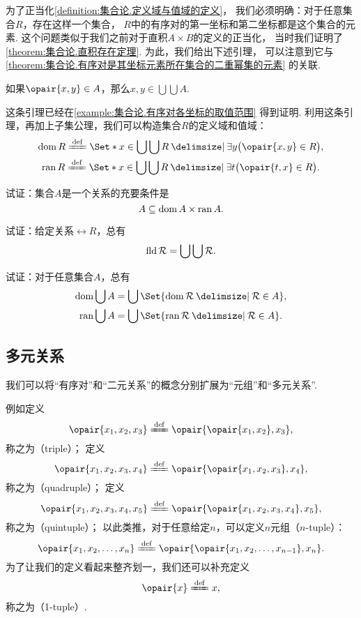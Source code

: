 为了正当化\cref{definition:集合论.定义域与值域的定义}，
我们必须明确：对于任意集合\(R\)，存在这样一个集合，
\(R\)中的有序对的第一坐标和第二坐标都是这个集合的元素.
这个问题类似于我们之前对于直积\(A \times B\)的定义的正当化，
当时我们证明了\cref{theorem:集合论.直积存在定理}.
为此，我们给出下述引理，
可以注意到它与\cref{theorem:集合论.有序对是其坐标元素所在集合的二重幂集的元素} 的关联.

\begin{lemma}
如果\(\opair{x,y} \in A\)，那么\(x,y \in \bigcup\bigcup A\).
\end{lemma}
这条引理已经在\cref{example:集合论.有序对各坐标的取值范围} 得到证明.
利用这条引理，再加上子集公理，我们可以构造集合\(R\)的定义域和值域：
\begin{gather}
	\dom R
	\defeq
	\Set*{ x \in \bigcup\bigcup R \given \exists y \bigl( \opair{x,y} \in R \bigr) }, \\
	\ran R
	\defeq
	\Set*{ x \in \bigcup\bigcup R \given \exists t \bigl( \opair{t,x} \in R \bigr) }.
\end{gather}

\begin{example}
试证：集合\(A\)是一个关系的充要条件是\[
	A \subseteq \operatorname{dom} A \times \operatorname{ran} A.
\]
\end{example}

\begin{example}
试证：给定关系\(\rel{R}\)，总有\[
	\operatorname{fld} \mathcal{R} = \bigcup\bigcup \mathcal{R}.
\]
\end{example}

\begin{example}
试证：对于任意集合\(A\)，总有\begin{gather}
	\dom\bigcup A = \bigcup\Set{ \dom\rel{R} \given \rel{R} \in A }, \\
	\ran\bigcup A = \bigcup\Set{ \ran\rel{R} \given \rel{R} \in A }.
\end{gather}
\end{example}

\subsection{多元关系}
我们可以将“有序对”和“二元关系”的概念分别扩展为“元组”和“多元关系”.

例如定义\[
	\opair{x_1,x_2,x_3}
	\defeq
	\opair{\opair{x_1,x_2},x_3},
\]
称之为（triple）；
定义\[
	\opair{x_1,x_2,x_3,x_4}
	\defeq
	\opair{\opair{x_1,x_2,x_3},x_4},
\]
称之为（quadruple）；
定义\[
	\opair{x_1,x_2,x_3,x_4,x_5}
	\defeq
	\opair{\opair{x_1,x_2,x_3,x_4},x_5},
\]
称之为（quintuple）；
以此类推，对于任意给定\(n\)，可以定义\(n\)元组（\(n\)-tuple）：\[
	\opair{x_1,x_2,\dotsc,x_n}
	\defeq
	\opair{\opair{x_1,x_2,\dotsc,x_{n-1}},x_n}.
\]
为了让我们的定义看起来整齐划一，我们还可以补充定义\[
	\opair{x} \defeq x,
\]
称之为（1-tuple）.

